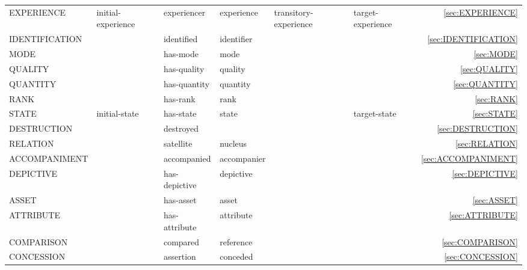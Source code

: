 \documentclass[a4paper]{article}
\newcommand{\fr}[1]{\textsf{#1}}
\newcommand{\rl}[1]{\textsf{#1}}
\newcommand{\Sub}{\textnoto{└} }
\newcommand{\SubSub}{\textcolor{white}{\Sub}\Sub}
\newcommand{\SubSubSub}{\textcolor{white}{\Sub}\SubSub}
\begin{document}
\begin{table}
{\begin{NiceTabular}{llllllr}
            \SubSub{} \fr{EXPERIENCE} & \rl{initial-experience} & \rl{experiencer} & \rl{experience} & \rl{transitory-experience} & \rl{target-experience} & \ref{sec:EXPERIENCE} \\

            \SubSub{} \fr{IDENTIFICATION} & & \rl{identified} & \rl{identifier} & & & \ref{sec:IDENTIFICATION} \\

            \SubSub{} \fr{MODE} & & \rl{has-mode} & \rl{mode} & & & \ref{sec:MODE} \\

            \SubSub{} \fr{QUALITY} & & \rl{has-quality} & \rl{quality} & & & \ref{sec:QUALITY} \\

            \SubSub{} \fr{QUANTITY} & & \rl{has-quantity} & \rl{quantity} & & & \ref{sec:QUANTITY} \\

            \SubSub{} \fr{RANK} & & \rl{has-rank} & \rl{rank} & & & \ref{sec:RANK} \\

            \SubSub{} \fr{STATE} & \rl{initial-state} & \rl{has-state} & \rl{state} & & \rl{target-state} & \ref{sec:STATE} \\
            \SubSubSub{} \fr{DESTRUCTION} & & \rl{destroyed} & & & & \ref{sec:DESTRUCTION} \\

            \Sub{} \fr{RELATION} & & \rl{satellite} & \rl{nucleus} & & & \ref{sec:RELATION} \\

            \SubSub{} \fr{ACCOMPANIMENT} & & \rl{accompanied} & \rl{accompanier} & & & \ref{sec:ACCOMPANIMENT} \\
            \SubSubSub{} \fr{DEPICTIVE} & & \rl{has-depictive} & \rl{depictive} & & & \ref{sec:DEPICTIVE} \\

            \SubSub{} \fr{ASSET} & & \rl{has-asset} & \rl{asset} & & & \ref{sec:ASSET} \\

            \SubSub{} \fr{ATTRIBUTE} & & \rl{has-attribute} & \rl{attribute} & & & \ref{sec:ATTRIBUTE} \\

            \SubSub{} \fr{COMPARISON} & & \rl{compared} & \rl{reference} & & & \ref{sec:COMPARISON} \\
            \SubSubSub{} \fr{CONCESSION} & & \rl{assertion} & \rl{conceded} & & & \ref{sec:CONCESSION} \\


\end{NiceTabular}}
\end{table}
\end{document}
